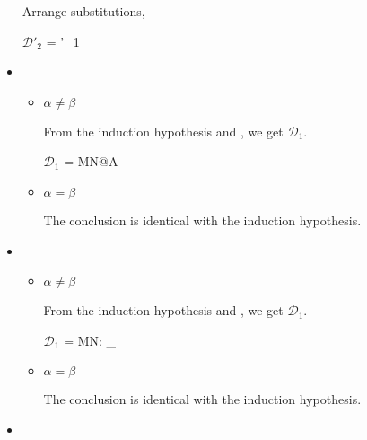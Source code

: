 \begin{itemize}
	      Arrange substitutions,
	      	      
	      $\mathcal{D}'_2$ = 
	      {'_1 \andalso {}}
	      	      
	\item \QTB
	      	      
	      \begin{itemize}
	      		      	
	      	\item $\alpha \neq \beta$
	      	      	      	      
	      	      From the induction hypothesis and \QTB, we get $\mathcal{D}_1$.
	      	      	      	      
	      	      $\mathcal{D}_1$ = 
	      	      {\GGV M\SB \E N\SB @A\alpha\SB}
	      	      	      	      
	      	\item $\alpha = \beta$
	      	      	      	      
	      	      The conclusion is identical with the induction hypothesis.
	      	      	      	      
	      \end{itemize}
	      	      
	\item \QTBL
	      	      
	      \begin{itemize}
	      		      	
	      	\item $\alpha \neq \beta$
	      	      	      	      
	      	      From the induction hypothesis and \QTBL, we get $\mathcal{D}_1$.
	      	      	      	      
	      	      $\mathcal{D}_1$ = 
	      	      {\GGV M\SB \E N\SB : \TW_\alpha \tau@A\SB}
	      	      	      	      
	      	\item $\alpha = \beta$
	      	      	      	      
	      	      The conclusion is identical with the induction hypothesis.
	      	      	      	      
	      \end{itemize}
	      	      
	\item \QGen
	      	      

\end{itemize}
